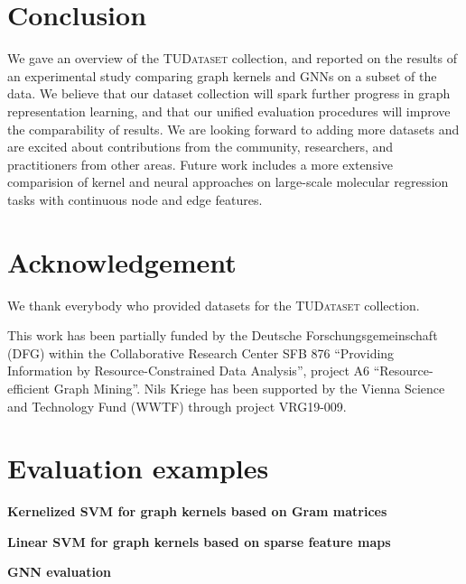 \documentclass{article}
\newcommand{\xhdr}[1]{{\noindent\bfseries #1}}
\theoremstyle{definition}
\begin{document}
\section{Conclusion}

We gave an overview of the \textsc{TUDataset} collection, and reported on the results of an experimental study comparing graph kernels and GNNs on a subset of the data. We believe that our dataset collection will spark further progress in graph representation learning, and that our unified evaluation procedures will improve the comparability of results. We are looking forward to adding more datasets and are excited about contributions from the community, researchers, and practitioners from other areas. Future work includes a more extensive comparision of kernel and neural approaches on large-scale molecular regression tasks with continuous node and edge features.

\section{Acknowledgement}

We thank everybody who provided datasets for the  \textsc{TUDataset} collection.

This work has been partially funded by the Deutsche Forschungsgemeinschaft (DFG) within 
the Collaborative Research Center SFB 876 ``Providing Information by 
Resource-Constrained Data Analysis'', project A6 ``Resource-efficient Graph Mining''.
Nils Kriege has been supported by the Vienna Science and Technology Fund (WWTF) 
through project VRG19-009.




\appendix

\onecolumn



\section{Evaluation examples}\label{evalcode}

\xhdr{Kernelized SVM for graph kernels based on Gram matrices}


\xhdr{Linear SVM for graph kernels based on sparse feature maps}


\xhdr{GNN evaluation}

\end{document}
